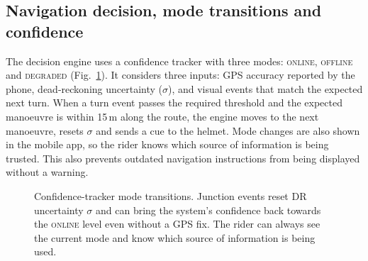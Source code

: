 \documentclass[conference]{IEEEtran}
\begin{document}
\subsection{Navigation decision, mode transitions and confidence}
The decision engine uses a confidence tracker with three modes: \textsc{online}, \textsc{offline} and \textsc{degraded} (Fig.~\ref{fig:fsm}). It considers three inputs: GPS accuracy reported by the phone, dead-reckoning uncertainty ($\sigma$), and visual events that match the expected next turn. When a turn event passes the required threshold and the expected manoeuvre is within 15\,m along the route, the engine moves to the next manoeuvre, resets $\sigma$ and sends a cue to the helmet. Mode changes are also shown in the mobile app, so the rider knows which source of information is being trusted. This also prevents outdated navigation instructions from being displayed without a warning.

\begin{figure}[t]
\centering
{}
\caption{Confidence-tracker mode transitions. Junction events reset DR uncertainty $\sigma$ and can bring the system's confidence back towards the \textsc{online} level even without a GPS fix. The rider can always see the current mode and know which source of information is being used.}
\label{fig:fsm}
\end{figure}
\end{document}
